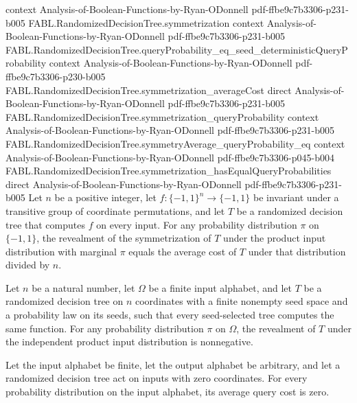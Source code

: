 \begin{theorem}
  {context}
  {Analysis-of-Boolean-Functions-by-Ryan-ODonnell}
  {pdf-ffbe9c7b3306-p231-b005}
\proofstep
  {FABL.RandomizedDecisionTree.symmetrization}
  {context}
  {Analysis-of-Boolean-Functions-by-Ryan-ODonnell}
  {pdf-ffbe9c7b3306-p231-b005}
\proofstep
  {FABL.RandomizedDecisionTree.queryProbability_eq_seed_deterministicQueryProbability}
  {context}
  {Analysis-of-Boolean-Functions-by-Ryan-ODonnell}
  {pdf-ffbe9c7b3306-p230-b005}
\proofstep
  {FABL.RandomizedDecisionTree.symmetrization_averageCost}
  {direct}
  {Analysis-of-Boolean-Functions-by-Ryan-ODonnell}
  {pdf-ffbe9c7b3306-p231-b005}
\proofstep
  {FABL.RandomizedDecisionTree.symmetrization_queryProbability}
  {context}
  {Analysis-of-Boolean-Functions-by-Ryan-ODonnell}
  {pdf-ffbe9c7b3306-p231-b005}
\proofstep
  {FABL.RandomizedDecisionTree.symmetryAverage_queryProbability_eq}
  {context}
  {Analysis-of-Boolean-Functions-by-Ryan-ODonnell}
  {pdf-ffbe9c7b3306-p045-b004}
\proofstep
  {FABL.RandomizedDecisionTree.symmetrization_hasEqualQueryProbabilities}
  {direct}
  {Analysis-of-Boolean-Functions-by-Ryan-ODonnell}
  {pdf-ffbe9c7b3306-p231-b005}
Let $n$ be a positive integer, let $f:\{-1,1\}^n\to\{-1,1\}$ be invariant under a
transitive group of coordinate permutations, and let $T$ be a randomized decision tree
that computes $f$ on every input. For any probability distribution $\pi$ on $\{-1,1\}$,
the revealment of the symmetrization of $T$ under the product input distribution with
marginal $\pi$ equals the average cost of $T$ under that distribution divided by $n$.
\end{theorem}

\begin{theorem}
\label{FABL.RandomizedDecisionTree.revealment_nonneg}
\leanok
{}
Let $n$ be a natural number, let $\Omega$ be a finite input alphabet, and let $T$ be a
randomized decision tree on $n$ coordinates with a finite nonempty seed space and a
probability law on its seeds, such that every seed-selected tree computes the same
function. For any probability distribution $\pi$ on $\Omega$, the revealment of $T$
under the independent product input distribution is nonnegative.
\end{theorem}

\begin{theorem}
\label{FABL.RandomizedDecisionTree.averageCost_zero_dimension}
\leanok
{}
Let the input alphabet be finite, let the output alphabet be arbitrary, and let a
randomized decision tree act on inputs with zero coordinates. For every probability
distribution on the input alphabet, its average query cost is zero.
\end{theorem}

